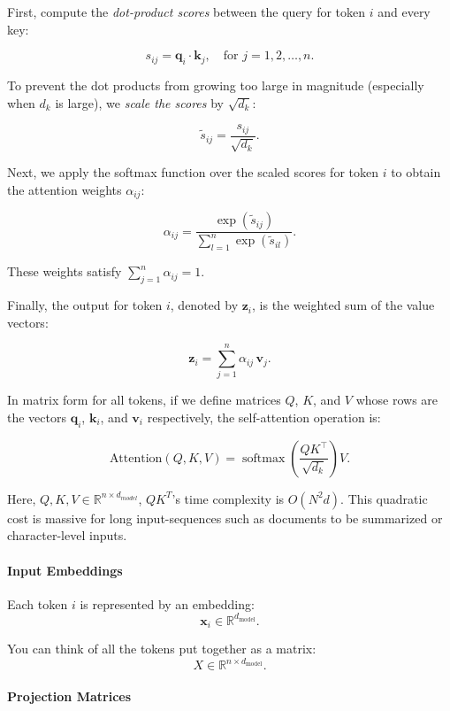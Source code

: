First, compute the \textit{dot-product scores} between the query for token \( i \) and every key:

\[
s_{ij} = \mathbf{q}_i \cdot \mathbf{k}_j, \quad \text{for } j = 1, 2, \dots, n.
\]

To prevent the dot products from growing too large in magnitude (especially when \( d_k \) is large), we \textit{scale the scores} by \( \sqrt{d_k} \):

\[
\tilde{s}_{ij} = \frac{s_{ij}}{\sqrt{d_k}}.
\]

Next, we apply the softmax function over the scaled scores for token \( i \) to obtain the attention weights \( \alpha_{ij} \):

\[
\alpha_{ij} = \frac{\exp(\tilde{s}_{ij})}{\displaystyle \sum_{l=1}^{n} \exp(\tilde{s}_{il})}.
\]

These weights satisfy \( \sum_{j=1}^{n} \alpha_{ij} = 1 \).

Finally, the output for token \( i \), denoted by \( \mathbf{z}_i \), is the weighted sum of the value vectors:

\[
\mathbf{z}_i = \sum_{j=1}^{n} \alpha_{ij} \, \mathbf{v}_j.
\]

In matrix form for all tokens, if we define matrices \( Q \), \( K \), and \( V \) whose rows are the vectors \( \mathbf{q}_i \), \( \mathbf{k}_i \), and \( \mathbf{v}_i \) respectively, the self-attention operation is:

\[
\text{Attention}(Q, K, V) = \operatorname{softmax}\!\left(\frac{QK^\top}{\sqrt{d_k}}\right) V.
\]

Here, $Q, K, V\in \mathbb{R}^{n\times d_{model}}$, $QK^T$'s time complexity is $O(N^2d)$. This quadratic cost is massive for long input-sequences such as documents to be summarized or character-level inputs.

\paragraph{Input Embeddings}

   Each token \( i \) is represented by an embedding:
   \[
   \mathbf{x}_i \in \mathbb{R}^{d_{\text{model}}}.
   \]
   
   You can think of all the tokens put together as a matrix:
   \[
   X \in \mathbb{R}^{n \times d_{\text{model}}}.
   \]

\paragraph{Projection Matrices}

